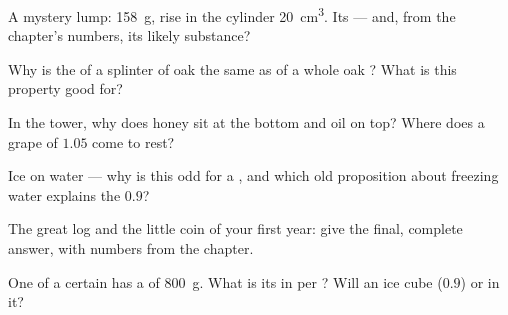\begin{exercise}[$\star$]\label{exo:g6:density-floating:4}
A mystery lump:  \qty{158}{g}, rise in the cylinder
\qty{20}{cm^3}. Its  --- and, from the chapter's numbers,
its likely substance?
\end{exercise}

\begin{exercise}[$\star$]\label{exo:g6:density-floating:5}
Why is the  of a splinter of oak the same as of a whole
oak ? What is this property good for?
\end{exercise}

\begin{exercise}[$\star$]\label{exo:g6:density-floating:6}
In the  tower, why does honey sit at the bottom and oil on
top? Where does a grape of  $1.05$ come to rest?
\end{exercise}

\begin{exercise}[$\star$]\label{exo:g6:density-floating:7}
Ice  on water --- why is this odd for a , and which
old proposition about freezing water explains the $0.9$?
\end{exercise}

\begin{exercise}[$\star$]\label{exo:g6:density-floating:8}
The great log and the little coin of your first year: give the
final, complete answer, with numbers from the chapter.
\end{exercise}

\begin{exercise}[$\star\star$]\label{exo:g6:density-floating:9}
One  of a certain  has a  of \qty{800}{g}. What is
its  in  per ? Will an ice cube
($0.9$)  or  in it?
\end{exercise}


